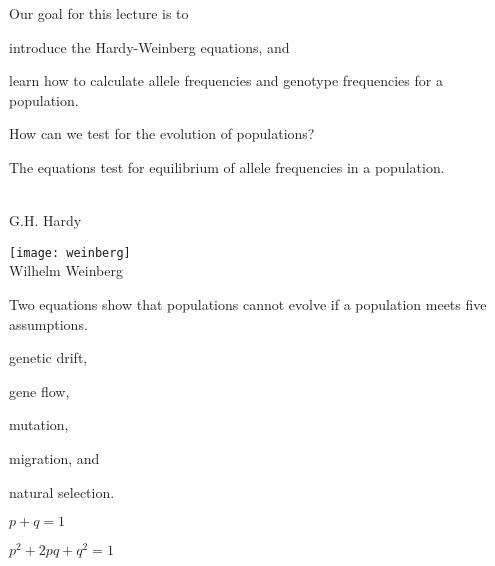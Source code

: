 \documentclass[t]{beamer}
\begin{document}
\begin{frame}{Our goal for this lecture is to}
	
	\hangpara introduce the Hardy-Weinberg equations, and 
	
	\hangpara learn how to calculate allele frequencies and genotype frequencies for a population. 
	
	\vspace*{2\baselineskip}
	
	\hangpara How can we test for the evolution of populations?
	
\end{frame}
%

\begin{frame}[t]{The  equations test for equilibrium of allele frequencies in a population.}

	\vspace*{-\baselineskip}
	
	\begin{multicols}{2}
	
		{\centering {}\\
		G.H. Hardy\par
		}
		
	\columnbreak
	
		{\centering \texttt{[image: weinberg]}\\
		Wilhelm Weinberg\par
		}
		
	\end{multicols}
	
\end{frame}

\begin{frame}[t]{Two equations show that populations cannot evolve if a population meets five assumptions.}

	\vspace*{-\baselineskip}
	
	\begin{multicols}{2}

	\hangpara {} genetic drift,
	
	\hangpara {} gene flow,

	\hangpara {} mutation,
	
	\hangpara {} migration, and
	
	\hangpara {} natural selection.
	
	\columnbreak

	\hangpara $p + q = 1$
	
	\hangpara $p^2 + 2pq + q^2 = 1$
	
	\end{multicols}

\end{frame}
\end{document}
